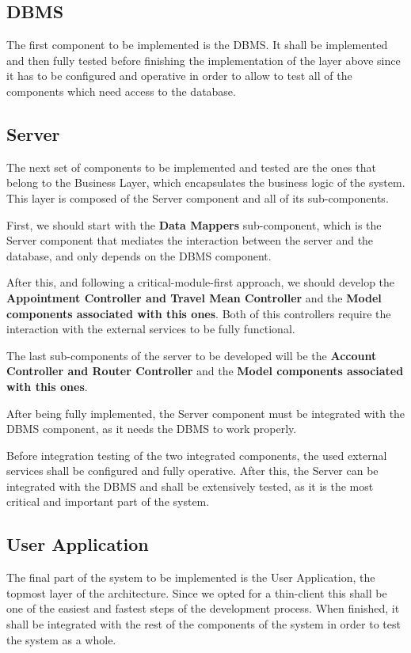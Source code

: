 \documentclass[12pt]{article}
\begin{document}
\subsection{DBMS}
The first component to be implemented is the DBMS. It shall be implemented and then fully tested before finishing the implementation of the layer above since it has to be configured and operative in order to allow to test all of the components which need access to the database.
    
\subsection{Server}
The next set of components to be implemented and tested are the ones that belong to the Business Layer, which encapsulates the business logic of the system. This layer is composed of the Server component and all of its sub-components. 

First, we should start with the \textbf{Data Mappers} sub-component, which is the Server component that mediates the interaction between the server and the database, and only depends on the DBMS component.

After this, and following a critical-module-first approach, we should develop the \textbf{Appointment Controller and Travel Mean Controller} and the \textbf{Model components associated with this ones}. Both of this controllers require the interaction with the external services to be fully functional.

The last sub-components of the server to be developed will be the \textbf{Account Controller and Router Controller} and the \textbf{Model components associated with this ones}.

After being fully implemented, the Server component must be integrated with the DBMS component, as it needs the DBMS to work properly.

Before integration testing of the two integrated components, the used external services shall be configured and fully operative.
After this, the Server can be integrated with the DBMS and shall be extensively tested, as it is the most critical and important part of the system.

\subsection{User Application}
The final part of the system to be implemented is the User Application, the topmost layer of the architecture. Since we opted for a thin-client this shall be one of the easiest and fastest steps of the development process.
When finished, it shall be integrated with the rest of the components of the system in order to test the system as a whole.
\end{document}
